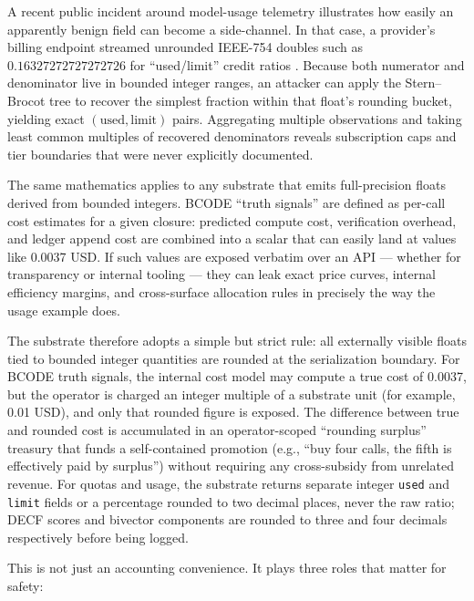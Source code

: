 A recent public incident around model-usage telemetry illustrates how
easily an apparently benign field can become a side-channel. In that
case, a provider's billing endpoint streamed unrounded IEEE-754 doubles
such as \(0.16327272727272726\) for ``used/limit'' credit ratios
\citep{katsarosgiannis2026}. Because both numerator and denominator live
in bounded integer ranges, an attacker can apply the Stern--Brocot tree
to recover the simplest fraction within that float's rounding bucket,
yielding exact \((\text{used},\text{limit})\) pairs. Aggregating
multiple observations and taking least common multiples of recovered
denominators reveals subscription caps and tier boundaries that were
never explicitly documented.

The same mathematics applies to any substrate that emits full-precision
floats derived from bounded integers. BCODE ``truth signals'' are
defined as per-call cost estimates for a given closure: predicted
compute cost, verification overhead, and ledger append cost are combined
into a scalar that can easily land at values like 0.0037 USD. If such
values are exposed verbatim over an API --- whether for transparency or
internal tooling --- they can leak exact price curves, internal
efficiency margins, and cross-surface allocation rules in precisely the
way the usage example does.

The substrate therefore adopts a simple but strict rule: all externally
visible floats tied to bounded integer quantities are rounded at the
serialization boundary. For BCODE truth signals, the internal cost model
may compute a true cost of 0.0037, but the operator is charged an
integer multiple of a substrate unit (for example, 0.01 USD), and only
that rounded figure is exposed. The difference between true and rounded
cost is accumulated in an operator-scoped ``rounding surplus'' treasury
that funds a self-contained promotion (e.g., ``buy four calls, the fifth
is effectively paid by surplus'') without requiring any cross-subsidy
from unrelated revenue. For quotas and usage, the substrate returns
separate integer \texttt{used} and \texttt{limit} fields or a percentage
rounded to two decimal places, never the raw ratio; DECF scores and
bivector components are rounded to three and four decimals respectively
before being logged.

This is not just an accounting convenience. It plays three roles that
matter for safety:

